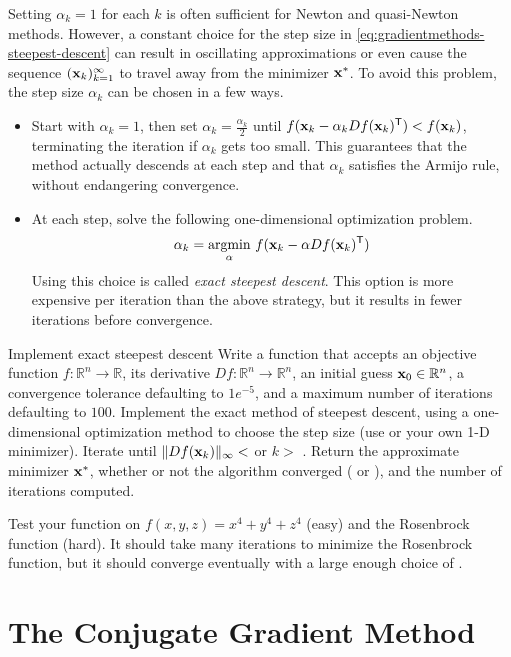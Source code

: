 Setting $\alpha_k = 1$ for each $k$ is often sufficient for Newton and quasi-Newton methods.
However, a constant choice for the step size in \eqref{eq:gradientmethods-steepest-descent} can result in oscillating approximations or even cause the sequence $(\mathbf{x}_k)_{k=1}^\infty$ to travel away from the minimizer $\mathbf{x}^*$.
To avoid this problem, the step size $\alpha_k$ can be chosen in a few ways.
\begin{itemize}
    \item Start with $\alpha_k = 1$, then set $\alpha_k = \frac{\alpha_k}{2}$ until $f(\mathbf{x}_k - \alpha_k Df(\mathbf{x}_k)^{\mathsf T}) < f(\mathbf{x}_k)$, terminating the iteration if $\alpha_k$ gets too small.
    This guarantees that the method actually descends at each step and that $\alpha_k$ satisfies the Armijo rule, without endangering convergence.

    \item At each step, solve the following one-dimensional optimization problem.
    \[
    \alpha_k = \underset{\alpha}{\mbox{argmin}}\ f(\mathbf{x}_k - \alpha Df(\mathbf{x}_k)^{\mathsf T})
    \]
    Using this choice is called \emph{exact steepest descent}.
    This option is more expensive per iteration than the above strategy, but it results in fewer iterations before convergence.
\end{itemize}

\begin{problem}{Implement exact steepest descent}{}
Write a function that accepts an objective function $f:\mathbb{R}^n\rightarrow\mathbb{R}$, its derivative $Df:\mathbb{R}^n\rightarrow\mathbb{R}^n$, an initial guess $\mathbf{x}_0\in\mathbb{R}^n$, a convergence tolerance  defaulting to $1e^{-5}$, and a maximum number of iterations  defaulting to $100$.
Implement the exact method of steepest descent, using a one-dimensional optimization method to choose the step size (use  or your own 1-D minimizer).
Iterate until $\|Df(\mathbf{x}_k)\|_{\infty} < $  or $k > $ .
Return the approximate minimizer $\mathbf{x}^*$, whether or not the algorithm converged ( or ), and the number of iterations computed.

Test your function on $f(x,y,z) = x^4 + y^4 + z^4$ (easy) and the Rosenbrock function (hard).
It should take many iterations to minimize the Rosenbrock function, but it should converge eventually with a large enough choice of .
\label{prob:gradientmethods-steepest-descent}
\end{problem}

\section*{The Conjugate Gradient Method} %

